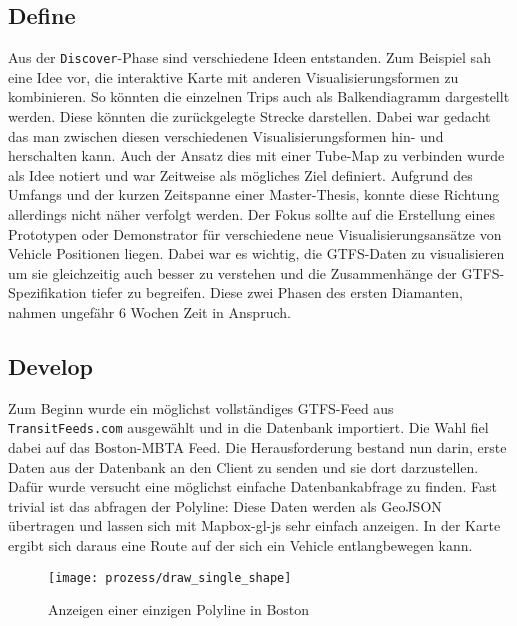 \begin{newpage}
    \subsection{Define}
    \label{sub:define}
      Aus der \texttt{Discover}-Phase sind verschiedene Ideen entstanden. Zum Beispiel sah eine Idee vor, die interaktive Karte mit anderen Visualisierungsformen zu kombinieren. So könnten die einzelnen Trips auch als Balkendiagramm dargestellt werden. Diese könnten die zurückgelegte Strecke darstellen. Dabei war gedacht das man zwischen diesen verschiedenen Visualisierungsformen hin- und herschalten kann. Auch der Ansatz dies mit einer Tube-Map zu verbinden wurde als Idee notiert und war Zeitweise als mögliches Ziel definiert. Aufgrund des Umfangs und der kurzen Zeitspanne einer Master-Thesis, konnte diese Richtung allerdings nicht näher verfolgt werden. Der Fokus sollte auf die Erstellung eines Prototypen oder Demonstrator für verschiedene neue Visualisierungsansätze von Vehicle Positionen liegen. Dabei war es wichtig, die GTFS-Daten zu visualisieren um sie gleichzeitig auch besser zu verstehen und die Zusammenhänge der GTFS-Spezifikation tiefer zu begreifen. Diese zwei Phasen des ersten Diamanten, nahmen ungefähr 6 Wochen Zeit in Anspruch.

      

    \subsection{Develop}
    \label{sub:develop}
      Zum Beginn wurde ein möglichst vollständiges GTFS-Feed aus \texttt{TransitFeeds.com} ausgewählt und in die Datenbank importiert. Die Wahl fiel dabei auf das Boston-MBTA Feed. Die Herausforderung bestand nun darin, erste Daten aus der Datenbank an den Client zu senden und sie dort darzustellen. Dafür wurde versucht eine möglichst einfache Datenbankabfrage zu finden. Fast trivial ist das abfragen der Polyline: \colorbox{materialGrey}{\texttt{}}
      Diese Daten werden als GeoJSON übertragen und lassen sich mit Mapbox-gl-js sehr einfach anzeigen. In der Karte ergibt sich daraus eine Route auf der sich ein Vehicle entlangbewegen kann.

      \begin{figure}[htbp]
        \begin{center}
          \texttt{[image: prozess/draw\_single\_shape]}
          \caption{Anzeigen einer einzigen Polyline in Boston}
          \label{fig:prozess/draw_single_shape}
        \end{center}
      \end{figure}
      

\end{newpage}
